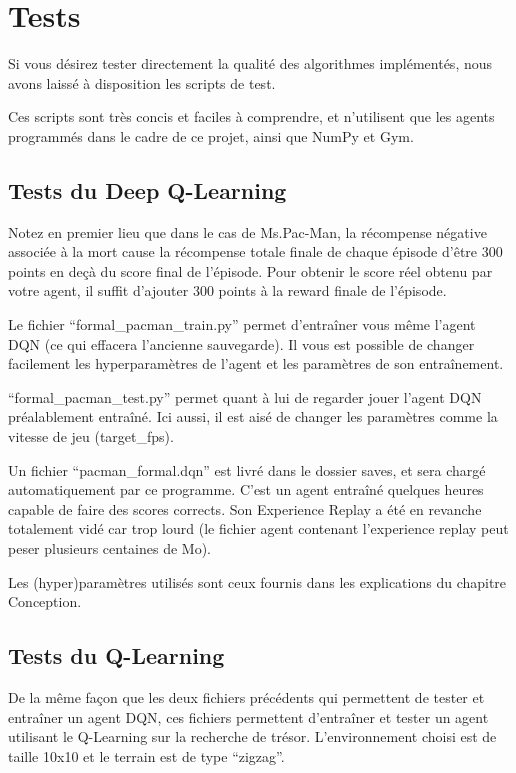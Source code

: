 \chapter{Tests}

Si vous désirez tester directement la qualité des algorithmes implémentés, nous avons laissé à disposition les scripts de test.
\par
Ces scripts sont très concis et faciles à comprendre, et n'utilisent que les agents programmés dans le cadre de ce projet, ainsi que NumPy et Gym.

\section{Tests du Deep Q-Learning}

Notez en premier lieu que dans le cas de Ms.Pac-Man, la récompense négative associée à la mort cause la récompense totale finale de chaque épisode d'être 300 points en deçà du score final de l'épisode. Pour obtenir le score réel obtenu par votre agent, il suffit d'ajouter 300 points à la reward finale de l'épisode.
\par
Le fichier ``formal\_pacman\_train.py'' permet d'entraîner vous même l'agent DQN (ce qui effacera l'ancienne sauvegarde). Il vous est possible de changer facilement les hyperparamètres de l'agent et les paramètres de son entraînement.
\par
``formal\_pacman\_test.py'' permet quant à lui de regarder jouer l'agent DQN préalablement entraîné. Ici aussi, il est aisé de changer les paramètres comme la vitesse de jeu (target\_fps). 
\par
Un fichier ``pacman\_formal.dqn'' est livré dans le dossier saves, et sera chargé automatiquement par ce programme. C'est un agent entraîné quelques heures capable de faire des scores corrects. Son Experience Replay a été en revanche totalement vidé car trop lourd (le fichier agent contenant l'experience replay peut peser plusieurs centaines de Mo). 
\par
Les (hyper)paramètres utilisés sont ceux fournis dans les explications du chapitre Conception.

\section{Tests du Q-Learning}
De la même façon que les deux fichiers précédents qui permettent de tester et entraîner un agent DQN, ces fichiers permettent d'entraîner et tester un agent utilisant le Q-Learning sur la recherche de trésor. L'environnement choisi est de taille 10x10 et le terrain est de type ``zigzag''.


